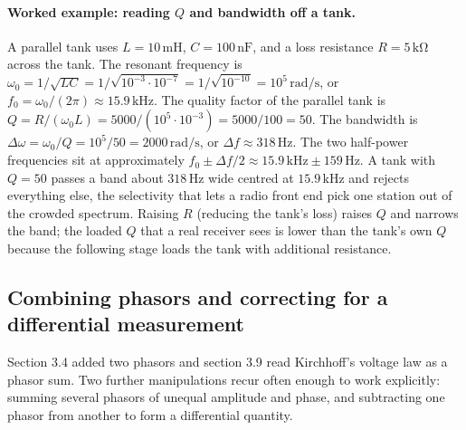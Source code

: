 \paragraph{Worked example: reading $Q$ and bandwidth off a tank.} A parallel
tank uses $L = 10\,\si{\milli\henry}$, $C = 100\,\si{\nano\farad}$, and a
loss resistance $R = 5\,\si{\kilo\ohm}$ across the tank. The resonant
frequency is $\omega_{0} = 1/\sqrt{LC} = 1/\sqrt{10^{-3}\cdot 10^{-7}} =
1/\sqrt{10^{-10}} = 10^{5}\,\si{\radian\per\second}$, or $f_{0} =
\omega_{0}/(2\pi) \approx 15.9\,\si{\kilo\hertz}$. The quality factor of the
parallel tank is $Q = R/(\omega_{0} L) = 5000/(10^{5}\cdot 10^{-3}) =
5000/100 = 50$. The bandwidth is $\Delta\omega = \omega_{0}/Q = 10^{5}/50 =
2000\,\si{\radian\per\second}$, or $\Delta f \approx 318\,\si{\hertz}$. The
two half-power frequencies sit at approximately $f_{0} \pm \Delta f/2
\approx 15.9\,\si{\kilo\hertz} \pm 159\,\si{\hertz}$. A tank with $Q = 50$
passes a band about $318\,\si{\hertz}$ wide centred at $15.9\,\si{\kilo
\hertz}$ and rejects everything else, the selectivity that lets a radio
front end pick one station out of the crowded spectrum. Raising $R$ (reducing
the tank's loss) raises $Q$ and narrows the band; the loaded $Q$ that a real
receiver sees is lower than the tank's own $Q$ because the following stage
loads the tank with additional resistance.

\subsection{Combining phasors and correcting for a differential measurement}

Section 3.4 added two phasors and section 3.9 read Kirchhoff's voltage law as
a phasor sum. Two further manipulations recur often enough to work
explicitly: summing several phasors of unequal amplitude and phase, and
subtracting one phasor from another to form a differential quantity.

